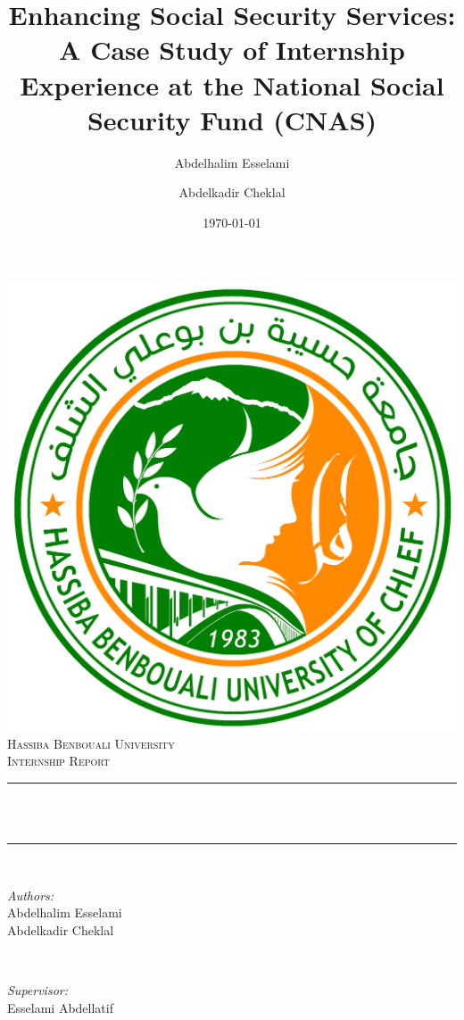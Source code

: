 \documentclass[12pt]{report}
\title{\Large Enhancing Social Security Services: A Case Study of Internship Experience at the National Social Security Fund (CNAS)}
\begin{document}
\author{Abdelhalim Esselami \and Abdelkadir Cheklal}
\date{\today}
\begin{titlepage}
    \centering
    \vspace*{0.5cm}
    \includegraphics[scale=0.2]{university-logo.png}\\[1.0cm]	%
    \textsc{\LARGE Hassiba Benbouali University}\\[2.0cm]	%
	\textsc{\Large Internship Report}\\[0.5cm]				%
	\rule{\linewidth}{0.2mm} \\[0.4cm]
	{\huge \bfseries \thetitle \\[0.4cm] }
	\rule{\linewidth}{0.2mm} \\[1.5cm]
	
	\begin{minipage}{0.4\textwidth}
		\begin{flushleft} \large
			\emph{Authors:}\\
			Abdelhalim Esselami \\
			Abdelkadir Cheklal
		\end{flushleft}
	\end{minipage}~
	\begin{minipage}{0.4\textwidth}
		\begin{flushright} \large
			\emph{Supervisor:} \\
			Esselami Abdellatif								%
		\end{flushright}
	\end{minipage}\\[2cm]
	
	{\large \thedate}\\[2cm]
	
	\vfill
\end{titlepage}
\tableofcontents





\end{document}
